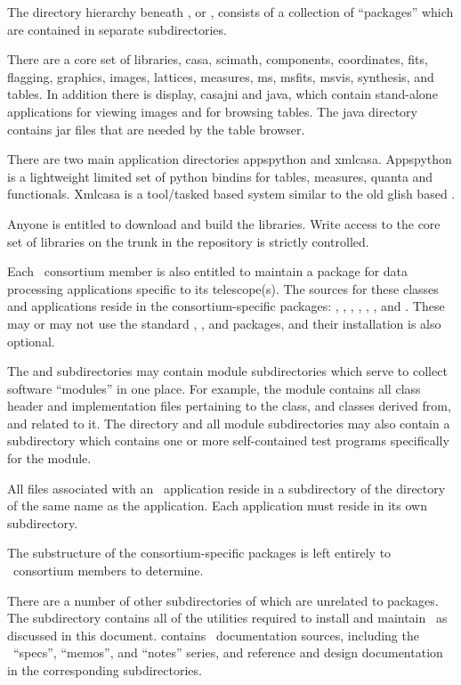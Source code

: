The directory hierarchy beneath , or ,
consists of a collection of ``packages'' which are contained in separate
subdirectories.

There are a core set of \casa libraries, casa, scimath, components, coordinates, fits, flagging,
graphics, images, lattices, measures, ms, msfits, msvis, synthesis, and tables. In addition there
is display, casajni and java, which contain stand-alone applications for viewing images and for
browsing tables. The java directory contains jar files that are needed by the table browser.

There are two main application directories appspython and xmlcasa. Appspython is a lightweight limited
set of python bindins for tables, measures, quanta and functionals. Xmlcasa is a tool/tasked based system
similar to the old glish based \casa.

Anyone is entitled to download and build the \casa libraries. Write access to the core set of
libraries on the trunk in the repository is strictly controlled.

Each \casa\ consortium member is also entitled to maintain a package for
data processing applications specific to its telescope(s).  The sources for
these classes and applications reside in the consortium-specific packages:
, , , , , ,
and .  These may or may not use the standard ,
, and  packages, and their installation is also
optional.

The  and  subdirectories may contain module
subdirectories which serve to collect software ``modules'' in one place.  For
example, the  module contains all class header and implementation
files pertaining to the  class, and classes derived from, and
related to it.  The  directory and all module subdirectories
may also contain a  subdirectory which contains one or more
self-contained test programs specifically for the module.

All files associated with an \casa\ application reside in a subdirectory of
the  directory of the same name as the application.  Each
application must reside in its own subdirectory.

The substructure of the consortium-specific packages is left entirely to
\casa\ consortium members to determine.

There are a number of other subdirectories of  which are
unrelated to packages.  The  subdirectory contains all of the
utilities required to install and maintain \casa\ as discussed in this
document.   contains \casa\ documentation sources, including the
\casa\ ``specs'', ``memos'', and ``notes'' series, and reference and design
documentation in the corresponding subdirectories.

